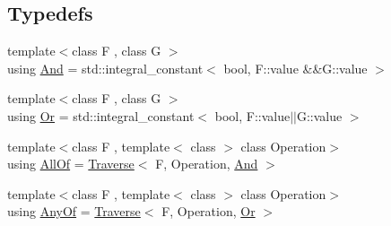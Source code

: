 \subsection*{Typedefs}
\begin{DoxyCompactItemize}
\item 
{\footnotesize template$<$class F , class G $>$ }\\using \hyperlink{namespacefuncy_1_1Meta_a41cc898590e15dae8d6da038f55f3cd2}{And} = std\-::integral\-\_\-constant$<$ bool, F\-::value \&\&G\-::value $>$
\item 
{\footnotesize template$<$class F , class G $>$ }\\using \hyperlink{namespacefuncy_1_1Meta_a7a832030d5229986a69d3518833e1b8f}{Or} = std\-::integral\-\_\-constant$<$ bool, F\-::value$\vert$$\vert$G\-::value $>$
\item 
{\footnotesize template$<$class F , template$<$ class $>$ class Operation$>$ }\\using \hyperlink{namespacefuncy_1_1Meta_a7957593ba11cc9c461684ee7efbeb3c4}{All\-Of} = \hyperlink{structfuncy_1_1Meta_1_1Traverse}{Traverse}$<$ F, Operation, \hyperlink{namespacefuncy_1_1Meta_a41cc898590e15dae8d6da038f55f3cd2}{And} $>$
\item 
{\footnotesize template$<$class F , template$<$ class $>$ class Operation$>$ }\\using \hyperlink{namespacefuncy_1_1Meta_ad563ba73c1ea4946f6168ad527e02346}{Any\-Of} = \hyperlink{structfuncy_1_1Meta_1_1Traverse}{Traverse}$<$ F, Operation, \hyperlink{namespacefuncy_1_1Meta_a7a832030d5229986a69d3518833e1b8f}{Or} $>$
\end{DoxyCompactItemize}


